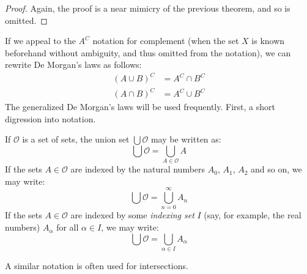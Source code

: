             \begin{proof}
                Again, the proof is a near mimicry of the previous theorem,
                and so is omitted.
            \end{proof}
            If we appeal to the $A^{C}$ notation for complement (when the
            set $X$ is known beforehand without ambiguity, and thus omitted from
            the notation), we can rewrite De Morgan's laws as follows:
            \begin{align}
                (A\cup{B})^{C}&=A^{C}\cap{B}^{C}\\
                (A\cap{B})^{C}&=A^{C}\cup{B}^{C}
            \end{align}
            The generalized De Morgan's laws will be used frequently. First, a
            short digression into notation.
            \begin{notation}
                If $\mathcal{O}$ is a set of sets, the union set
                $\bigcup\mathcal{O}$ may be written as:
                \begin{equation}
                    \bigcup\mathcal{O}=\bigcup_{A\in\mathcal{O}}A
                \end{equation}
                If the sets $A\in\mathcal{O}$ are indexed by the natural
                numbers $A_{0}$, $A_{1}$, $A_{2}$ and so on, we may write:
                \begin{equation}
                    \bigcup\mathcal{O}=\bigcup_{n=0}^{\infty}A_{n}
                \end{equation}
                If the sets $A\in\mathcal{O}$ are indexed by some
                \textit{indexing set} $I$ (say, for example, the real numbers)
                $A_{\alpha}$ for all $\alpha\in{I}$, we may write:
                \begin{equation}
                    \bigcup\mathcal{O}=\bigcup_{\alpha\in{I}}A_{\alpha}
                \end{equation}
            \end{notation}
            A similar notation is often used for intersections.
